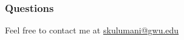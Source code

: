 \begin{frame} %
\frametitle{Questions}

Feel free to contact me at \href{mailto:skulumani@gwu.edu}{skulumani@gwu.edu}
\end{frame} %